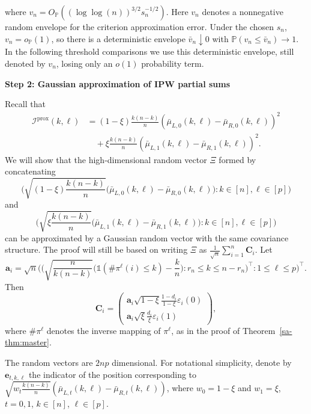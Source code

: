 \documentclass[10pt]{article}
\def\be{\mathbf{e}}
\def\bC{\mathbf{C}}
\def\P{\mathbb{P}}
\def\I{\mathscr{I}}
\newcommand{\Indicator}{\mathds{1}}
\theoremstyle{definition}
\theoremstyle{remark}
\begin{document}
where $v_n = O_\P((\log \log (n))^{3/2} s_n^{-1/2})$. Here $v_n$ denotes a nonnegative random envelope for the criterion approximation error. Under the chosen $s_n$, $v_n=o_\P(1)$, so there is a deterministic envelope $\bar v_n\downarrow0$ with $\P(v_n\leq\bar v_n)\to1$. In the following threshold comparisons we use this deterministic envelope, still denoted by $v_n$, losing only an $o(1)$ probability term.

\begin{center}
    \textbf{Step 2: Gaussian approximation of IPW partial sums}
\end{center}

Recall that 
\begin{align}\label{eq:prox}
    \I^\text{prox}(k, \ell)
    &= (1 - \xi)  \frac{k (n - k)}{n}
        (\bar \mu_{L,0}(k,\ell) - \bar \mu_{R,0}(k,\ell))^2 \nonumber\\
    &\quad + \xi \frac{k (n - k)}{n}
        (\bar \mu_{L,1}(k,\ell) - \bar \mu_{R,1}(k,\ell))^2.
\end{align}
We will show that the high-dimensional random vector $\Xi$ formed by
concatenating
\[
    \bigg(
        \sqrt{(1 - \xi) \frac{k (n - k)}{n}}
        \big(\bar \mu_{L,0}(k,\ell) - \bar \mu_{R,0}(k,\ell)\big):
        k \in [n], \ell \in [p]
    \bigg)
\]
and
\[
    \bigg(
        \sqrt{\xi \frac{k (n - k)}{n}}
        \big(\bar \mu_{L,1}(k,\ell) - \bar \mu_{R,1}(k,\ell)\big):
        k \in [n], \ell \in [p]
    \bigg)
\]
can be approximated by a Gaussian random vector with the same covariance
structure. The proof will still be based on writing
$\Xi$ as $\frac{1}{\sqrt{n}}\sum_{i = 1}^n \bC_i$. Let
\[
    \mathbf{a}_i
    =
    \sqrt{n}\Bigg(
        \bigg(
            \sqrt{\frac{n}{k(n-k)}}
            \Big(\Indicator(\#\pi^{\ell}(i) \leq k) - \frac{k}{n}\Big):
            r_n \leq k \leq n - r_n
        \bigg)^\top:
        1 \leq \ell \leq p
    \Bigg)^\top.
\]
Then
\[
    \bC_i =
    \begin{pmatrix}
        \mathbf{a}_i \sqrt{1-\xi}\frac{1 - d_i}{1 - \xi}\varepsilon_i(0) \\
        \mathbf{a}_i \sqrt{\xi}\frac{d_i}{\xi}\varepsilon_i(1)
    \end{pmatrix},
\]
where $\# \pi^{\ell}$ denotes the inverse mapping of $\pi^{\ell}$, as in the proof of Theorem~\ref{sa-thm:master}.

The random vectors are $2 n p$ dimensional. For notational simplicity, denote by $\be_{t,k,\ell}$ the indicator of the position corresponding to $\sqrt{w_t \frac{k (n - k)}{n}}(\bar \mu_{L,t}(k,\ell) - \bar \mu_{R,t}(k,\ell))$, where $w_0=1-\xi$ and $w_1=\xi$, $t = 0,1$, $k \in [n]$, $\ell \in [p]$.
\end{document}
